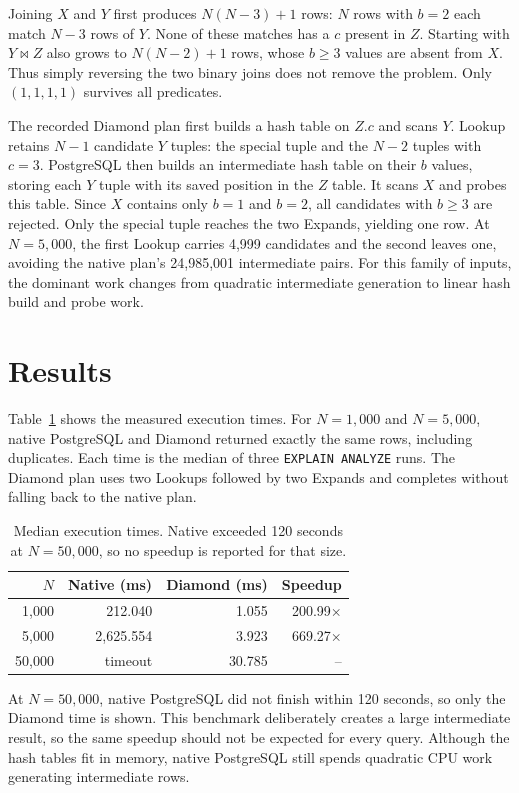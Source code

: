 \documentclass[10pt,twocolumn]{article}
\newcommand{\code}[1]{{\small\texttt{#1}}}
\begin{document}
Joining $X$ and $Y$ first produces $N(N-3)+1$ rows: $N$ rows with
$b=2$ each match $N-3$ rows of $Y$. None of these matches has a
$c$ present in $Z$. Starting with $Y\bowtie Z$ also grows to $N(N-2)+1$
rows, whose $b\geq3$ values are absent from $X$. Thus simply reversing the
two binary joins does not remove the problem. Only $(1,1,1,1)$ survives
all predicates.

The recorded Diamond plan first builds a hash table on $Z.c$ and scans $Y$.
Lookup retains $N-1$ candidate $Y$ tuples: the special tuple and the $N-2$
tuples with $c=3$. PostgreSQL then builds an intermediate hash table on their
$b$ values, storing each $Y$ tuple with its saved position in the $Z$ table.
It scans $X$ and probes this table. Since $X$ contains only $b=1$ and $b=2$,
all candidates with $b\geq3$ are rejected. Only the special tuple reaches the
two Expands, yielding one row. At $N=5{,}000$, the first Lookup carries 4,999
candidates and the second leaves one, avoiding the native plan's 24,985,001
intermediate pairs. For this family of inputs, the dominant work changes
from quadratic intermediate generation to linear hash build and probe work.

\section{Results}
Table~\ref{tab:results} shows the measured execution times. For
$N=1{,}000$ and $N=5{,}000$, native PostgreSQL and Diamond returned exactly
the same rows, including duplicates. Each time is the median of three
\code{EXPLAIN ANALYZE} runs. The Diamond plan uses two Lookups followed by
two Expands and completes without falling back to the native plan.

\begin{table}[ht]
\centering\small
\setlength{\tabcolsep}{4pt}
\begin{tabular}{rrrr}\toprule
$N$ & Native (ms) & Diamond (ms) & Speedup\\\midrule
1,000 & 212.040 & 1.055 & 200.99$\times$\\
5,000 & 2,625.554 & 3.923 & 669.27$\times$\\
50,000 & timeout & 30.785 & --\\\bottomrule
\end{tabular}
\caption{Median execution times. Native exceeded 120 seconds at
$N=50{,}000$, so no speedup is reported for that size.}
\label{tab:results}
\end{table}

At $N=50{,}000$, native PostgreSQL did not finish within 120 seconds,
so only the Diamond time is shown. This benchmark deliberately creates a
large intermediate result, so the same speedup should not be expected for
every query. Although the hash tables fit in memory, native PostgreSQL still
spends quadratic CPU work generating intermediate rows.
\end{document}
